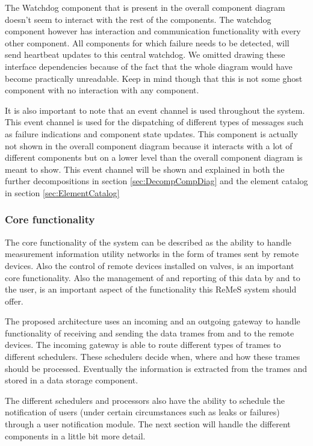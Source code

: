  The Watchdog component that is present in the overall component diagram doesn't seem to interact with the rest of the components. The watchdog component however has interaction and communication functionality with every other component. All components for which failure needs to be detected, will send heartbeat updates to this central watchdog. We omitted drawing these interface dependencies because of the fact that the whole diagram would have become practically  unreadable. Keep in mind though that this is not some ghost component with no interaction with any component.

It is also important to note that an event channel is used throughout the system. This event channel is used for the dispatching of different types of messages such as failure indications and component state updates. This component is actually not shown in the overall component diagram because it interacts with a lot of different components but on a lower level than the overall component diagram is meant to show.
This event channel will be shown and explained in both the further decompositions in section \ref{sec:DecompCompDiag} and the element catalog in section \ref{sec:ElementCatalog}
\subsubsection{Core functionality}
The core functionality of the system can be described as the ability to handle measurement information utility networks in the form of trames sent by remote devices. Also the control of remote devices installed on valves, is an important core functionality. Also the management of and reporting of this data by and to the user, is an important aspect of the functionality this ReMeS system should offer.

The proposed architecture uses an incoming and an outgoing gateway to handle functionality of receiving and sending the data trames from and to the remote devices. The incoming gateway is able to route different types of trames to different schedulers. These schedulers decide when, where and how these trames should be processed. Eventually the information is extracted from the trames and stored in a data storage component.   

The different schedulers and processors also have the ability to schedule the notification of users (under certain circumstances such as leaks or failures) through a user notification module.
The next section will handle the different components in a little bit more detail. 

